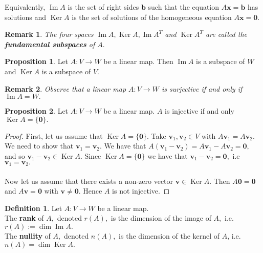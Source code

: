 \documentclass[12pt, a4paper]{article}
\newtheorem*{remark}{Remark}
\theoremstyle{definition}
\newtheorem{definition}{Definition}[section]
\newtheorem{proposition}{Proposition}
\theoremstyle{plain}
\newcommand{\vect}[1]{\mathbf{#1}}
\DeclareMathOperator{\im}{Im}
\DeclareMathOperator{\Ker}{Ker}
\begin{document}
Equivalently, $\im{A}$ is the set of right sides $\vect{b}$ such that the equation $A\vect{x} = \vect{b}$ has solutions and $\Ker{A}$ is the set of solutions of the homogeneous equation $A\vect{x} = \vect{0}.$

\begin{remark}
The four spaces $\im{A}, \Ker{A}, \im{A^T}$ and $\Ker{A^T}$ are called the \textbf{fundamental subspaces} of $A.$
\end{remark}

\begin{proposition} Let $A : V \rightarrow W$ be a linear map. Then $\im{A}$ is a subspace of $W$ and $\Ker{A}$ is a subspace of $V.$ \end{proposition}

\begin{remark}
Observe that a linear map $A:V\rightarrow W$ is surjective if and only if $\im{A}=W.$
\end{remark}

\begin{proposition} Let $A : V \rightarrow W$ be a linear map. $A$ is injective if and only $\Ker{A}=\{\vect{0}\}.$ \end{proposition}

\begin{proof}
First, let us assume that $\Ker{A} = \{\vect{0}\}.$ Take $\vect{v}_1,\vect{v}_2 \in V$ with $A\vect{v}_1 = A\vect{v}_2.$ We need to show that $\vect{v}_1 =\vect{v}_2.$ We have that $A(\vect{v}_1-\vect{v}_2)=A\vect{v}_1-A\vect{v}_2 =\vect{0},$ and so $\vect{v}_1 - \vect{v}_2 \in \Ker{A}.$ Since $\Ker{A} = \{\vect{0}\}$ we have that $\vect{v}_1 - \vect{v}_2 = \vect{0},$ i.e $\vect{v}_1 =\vect{v}_2.$ \\  \\ Now let us assume that there exists a non-zero vector $\vect{v} \in \Ker{A}.$ Then $A\vect{0} = \vect{0}$ and $A\vect{v} = \vect{0}$ with $\vect{v} \neq \vect{0}.$ Hence $A$ is not injective.
\end{proof}

\begin{definition} Let $A : V \rightarrow W$ be a linear map.\\
The \textbf{rank} of $A,$ denoted $r(A),$ is the dimension of the image of $A,$ i.e. $r(A) := \dim{\im{A}}.$\\
The \textbf{nullity} of $A,$ denoted $n(A),$ is the dimension of the kernel of $A$, i.e. $n(A) = \dim{\Ker{A}}.$ \end{definition}
\end{document}
